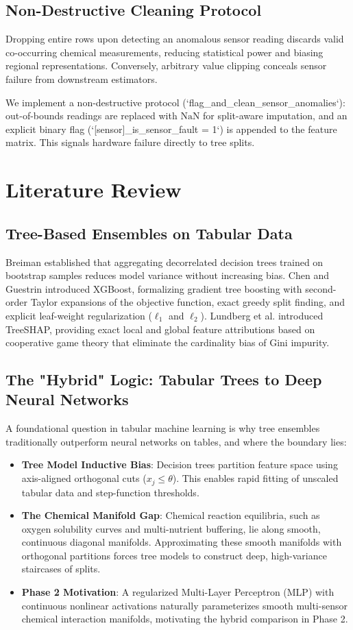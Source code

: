 \documentclass[conference]{IEEEtran}
\begin{document}
\subsection{Non-Destructive Cleaning Protocol}
Dropping entire rows upon detecting an anomalous sensor reading discards valid co-occurring chemical measurements, reducing statistical power and biasing regional representations. Conversely, arbitrary value clipping conceals sensor failure from downstream estimators. 

We implement a non-destructive protocol (`flag\_and\_clean\_sensor\_anomalies`): out-of-bounds readings are replaced with $\text{NaN}$ for split-aware imputation, and an explicit binary flag (`[sensor]\_is\_sensor\_fault = 1`) is appended to the feature matrix. This signals hardware failure directly to tree splits.

\section{Literature Review}
\subsection{Tree-Based Ensembles on Tabular Data}
Breiman \cite{breiman2001random} established that aggregating decorrelated decision trees trained on bootstrap samples reduces model variance without increasing bias. Chen and Guestrin \cite{chen2016xgboost} introduced XGBoost, formalizing gradient tree boosting with second-order Taylor expansions of the objective function, exact greedy split finding, and explicit leaf-weight regularization ($\ell_1$ and $\ell_2$). Lundberg et al. \cite{lundberg2020local} introduced TreeSHAP, providing exact local and global feature attributions based on cooperative game theory that eliminate the cardinality bias of Gini impurity.

\subsection{The "Hybrid" Logic: Tabular Trees to Deep Neural Networks}
A foundational question in tabular machine learning is why tree ensembles traditionally outperform neural networks on tables, and where the boundary lies:
\begin{itemize}
    \item \textbf{Tree Model Inductive Bias}: Decision trees partition feature space using axis-aligned orthogonal cuts ($x_j \le \theta$). This enables rapid fitting of unscaled tabular data and step-function thresholds.
    \item \textbf{The Chemical Manifold Gap}: Chemical reaction equilibria, such as oxygen solubility curves and multi-nutrient buffering, lie along smooth, continuous diagonal manifolds. Approximating these smooth manifolds with orthogonal partitions forces tree models to construct deep, high-variance staircases of splits.
    \item \textbf{Phase 2 Motivation}: A regularized Multi-Layer Perceptron (MLP) with continuous nonlinear activations naturally parameterizes smooth multi-sensor chemical interaction manifolds, motivating the hybrid comparison in Phase 2.
\end{itemize}
\end{document}
